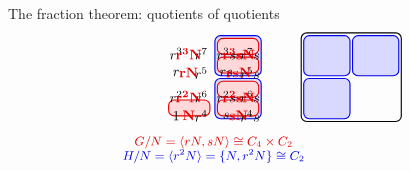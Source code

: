\documentclass[8pt, handout]{beamer}
\begin{document}
\begin{frame}{The fraction theorem: quotients of quotients}
\[\begin{tikzpicture}[xscale=.9,scale=.7]
\begin{scope}[shift={(5.5,0)}]
\begin{scope}[shift={(0,3.5)}]
        \draw[thick,xRed,fill=cosetRed,rounded corners] (.2,.2) rectangle (1.85,.2+.575);
        \draw[thick,xBlue,fill=cosetBlue,rounded corners] (2.05,1.65) rectangle (3.9,3.1);
        \draw[thick,xRed,fill=cosetRed,rounded corners] (2.15,3-.575) rectangle (3.8,3);
        \draw[thick,xRed,fill=cosetRed,rounded corners] (2.15,1.75) rectangle (3.8,1.75+.575);
        \draw[thick,xBlue,fill=cosetBlue,rounded corners] (2.05,.1) rectangle (3.9,1.55);   
        \draw[thick,xRed,fill=cosetRed,rounded corners] (2.15,1.45-.575) rectangle (3.8,1.45);
        \draw[thick,xRed,fill=cosetRed,rounded corners] (2.15,.2) rectangle (3.8,.2+.575);
        \node at (.5,2.45) {$r^3$};
        \node at (1.5,2.45) {$r^7$};
        \node at (.5,1.75) {$r$};
        \node at (1.5,1.75) {$r^5$};
        \node at (2.5,2.45) {$r^3s$};
        \node at (3.45,2.45) {$r^7s$};
        \node at (2.5,1.75) {$rs$};
        \node at (3.45,1.75) {$r^5s$};
        \node at (.5,.9) {$r^2$};
        \node at (1.5,.9) {$r^6$};
        \node at (.5,.2) {$1$};
        \node at (1.5,.2) {$r^4$};
        \node at (2.5,.9) {$r^2s$};
        \node at (3.45,.9) {$r^6s$};
        \node at (2.5,.2) {$s$};
        \node at (3.45,.2) {$r^4s$};
        \node at (1,2.45) {\Alert{$\mathbf{r^3N}$}};
        \node at (1,1.77) {\Alert{$\mathbf{rN}$}};
        \node at (3,2.45) {\Alert{$\mathbf{r^3sN}$}};
        \node at (3,1.77) {\Alert{$\mathbf{rsN}$}};
        \node at (1,.9) {\Alert{$\mathbf{r^2N}$}};
        \node at (1,.22) {\Alert{$\mathbf{N}$}};
        \node at (3,.9) {\Alert{$\mathbf{r^2sN}$}};
        \node at (3,.22) {\Alert{$\mathbf{sN}$}};
        \node at (2,-.75) {\small\Alert{$G/N=\<rN,sN\>\cong C_4\times C_2$}};
        \node at (2,-1.25) {\small\Balert{$H/N=\<r^2N\>=\{N,r^2N\}\cong C_2$}};
      \end{scope}
    \end{scope}
    \begin{scope}[shift={(11,0)}]
      \tikzstyle{every node}=[font=\footnotesize,anchor=south,faded]
      \begin{scope}[shift={(0,3.5)}]
        \draw[thick,rounded corners] (0,0) rectangle (4,3.2);
        \draw[thick,xBlue,fill=cosetBlue,rounded corners] (.1,1.65) rectangle (1.95,3.1);
        \draw[thick,xBlue,fill=cosetBlue,rounded corners] (.1,.1) rectangle (1.95,1.55);     
        \draw[thick,xBlue,fill=cosetBlue,rounded corners] (2.05,1.65) rectangle (3.9,3.1);

\end{scope}
\end{scope}
\end{tikzpicture}\]
\end{frame}
\end{document}
